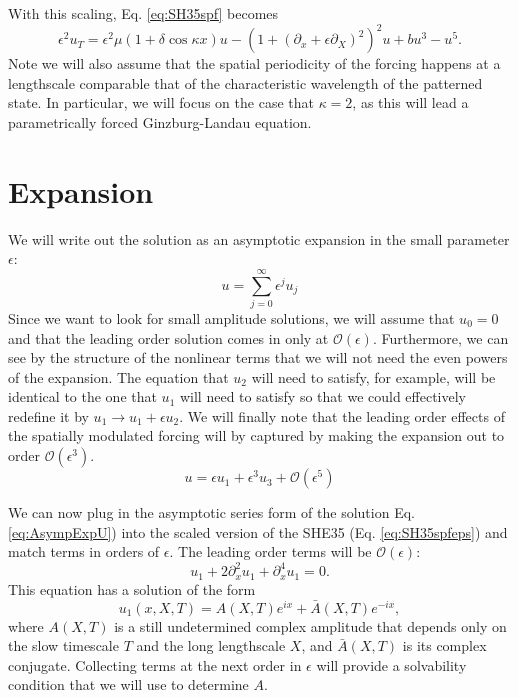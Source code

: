 \documentclass[api,pof,pre,12pt,a4paper]{revtex4-1}
\begin{document}
With this scaling, Eq. \ref{eq:SH35spf} becomes 
\begin{equation}
\epsilon^2 u_T = \epsilon^2 \mu(1+\delta \cos{\kappa x}) u -\left(1+(\partial_{x}+\epsilon \partial_X)^2\right)^2u+bu^3-u^5
\label{eq:SH35spfeps}.
\end{equation}
Note we will also assume that the spatial periodicity of the forcing happens at a lengthscale comparable that of the characteristic wavelength of the patterned state.  In particular, we will focus on the case that $\kappa=2$, as this will lead a parametrically forced Ginzburg-Landau equation.

\section{Expansion}
We will write out the solution as an asymptotic expansion in the small parameter $\epsilon$:
\begin{equation}
u=\sum_{j=0}^{\infty} \epsilon^j u_j
\end{equation}
Since we want to look for small amplitude solutions, we will assume that $u_0=0$ and that the leading order solution comes in only at $\mathcal{O}(\epsilon)$. Furthermore, we can see by the structure of the nonlinear terms that we will not need the even powers of the expansion.  The equation that $u_2$ will need to satisfy, for example, will be identical to the one that $u_1$ will need to satisfy so that we could effectively redefine it by $u_1\rightarrow u_1+\epsilon u_2$.  We will finally note that the leading order effects of the spatially modulated forcing will by captured by making the expansion out to order $\mathcal{O}(\epsilon^3)$.   
\begin{equation}
u=\epsilon u_1 + \epsilon^3 u_3  + \mathcal{O}(\epsilon^5)
\label{eq:AsympExpU}
\end{equation}

We can now plug in the asymptotic series form of the solution Eq. \ref{eq:AsympExpU}) into the scaled version of the SHE35 (Eq. \ref{eq:SH35spfeps}) and match terms in orders of $\epsilon$.  The leading order terms will be $\mathcal{O}(\epsilon)$:
\begin{equation}
u_1+2\partial_x^2 u_1 +\partial_x^4 u_1 = 0.
\end{equation}
This equation has a solution of the form
\begin{equation}
u_1(x,X,T)=A(X,T) e^{i x}+ \bar{A}(X,T) e^{-ix},
\label{eq:u1sol}
\end{equation}
where $A(X,T)$ is a still undetermined complex amplitude that depends only on the slow timescale $T$ and the long lengthscale $X$, and $\bar{A}(X,T)$ is its complex conjugate. Collecting terms at the next order in $\epsilon$ will provide a solvability condition that we will use to determine $A$.
\end{document}
